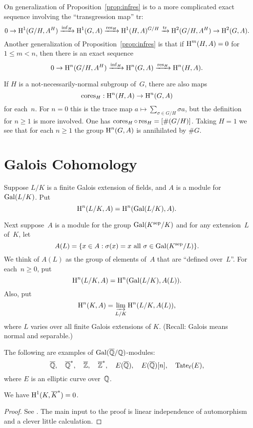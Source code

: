 \begin{remark}
On generalization of Proposition~\ref{prop:infres} is to
a more complicated exact sequence involving the ``transgression map''
tr:
$$
  0 \to \operatorname{H}^1(G/H, A^H)\xrightarrow{\operatorname{inf}_H} \operatorname{H}^1(G,A)\xrightarrow{\operatorname{res}_H} \operatorname{H}^1(H,A)^{G/H}
\xrightarrow{{\rm tr}}  \operatorname{H}^2(G/H,A^H) \to \operatorname{H}^2(G,A).
$$
Another generalization of Proposition~\ref{prop:infres}
is that if $\operatorname{H}^m(H,A) = 0$ for $1\leq m < n$, then
there is an exact sequence
$$
 0 \to \operatorname{H}^n(G/H, A^H)\xrightarrow{\operatorname{inf}_H}  \operatorname{H}^n(G,A)\xrightarrow{\operatorname{res}_H} \operatorname{H}^n(H,A).
$$
\end{remark}

\begin{remark}\label{rmk:cores}
  If $H$ is a not-necessarily-normal subgroup of~$G$, there are also
  maps
$$
 \operatorname{cores}_H: \operatorname{H}^n(H,A) \to \operatorname{H}^n(G,A)
$$
for each~$n$.  For $n=0$ this is the trace map $a\mapsto \sum_{\sigma
  \in G/H} \sigma a$, but the definition for $n\geq 1$ is more involved.
One has $\operatorname{cores}_H \circ \operatorname{res}_H = [\#(G/H)]$.
Taking $H=1$ we see
that for each $n\geq 1$ the group
$\operatorname{H}^n(G,A)$ is annihilated by $\#G$.
\end{remark}

\section{Galois Cohomology}
Suppose $L/K$ is a finite Galois extension of
fields, and $A$ is a module for $\operatorname{Gal}(L/K)$.
Put
$$
 \operatorname{H}^n(L/K, A) = \operatorname{H}^n(\operatorname{Gal}(L/K), A).
$$

Next suppose~$A$ is a module for the group $\operatorname{Gal}(K^{\operatorname{sep}}/K)$
and for any extension~$L$ of~$K$, let
$$A(L) = \{x \in A : \sigma(x) = x \text{ all } \sigma \in\operatorname{Gal}(K^{\operatorname{sep}}/L)\}.$$
We think of $A(L)$ as the group of elements of~$A$ that are
``defined over~$L$''.
For each~$n\geq 0$, put
 $$
  \operatorname{H}^n(L/K, A) = \operatorname{H}^n(\operatorname{Gal}(L/K), A(L)).
$$
Also, put
$$
 \operatorname{H}^n(K,A) = \varinjlim_{L/K} \operatorname{H}^n(L/K,A(L)),
$$
where $L$ varies over all finite Galois extensions of $K$.
(Recall: Galois means normal and separable.)

\begin{example}
The following are examples of $\operatorname{Gal}(\overline{\mathbb{Q}}/\mathbb{Q})$-modules:
$$
  \overline{\mathbb{Q}},\quad \overline{\mathbb{Q}}^*,\quad \overline{\mathbb{Z}},\quad\overline{\mathbb{Z}}^*,\quad E(\overline{\mathbb{Q}}),\quad
 E(\overline{\mathbb{Q}})[n], \quad {\rm Tate}_{\ell}(E),
$$
where $E$ is an elliptic curve over~$\mathbb{Q}$.
\end{example}

\begin{theorem}[Hilbert 90]\label{thm:h90}
We have $\operatorname{H}^1(K,\overline{K}^*) = 0$.
\end{theorem}
\begin{proof}
See \cite{serre:localfields}.  The main input to the proof is linear
independence of automorphism and a clever little calculation.
\end{proof}

